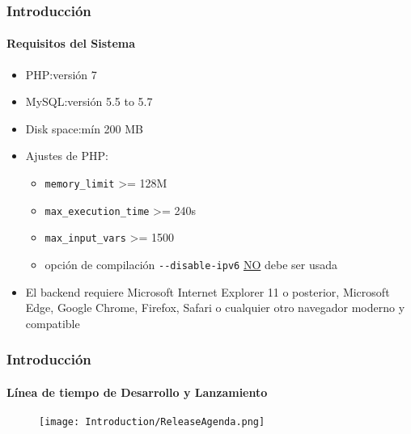 \begin{frame}[fragile]
	\frametitle{Introducción}
	\framesubtitle{Requisitos del Sistema}

	\begin{itemize}
		\item PHP:\tabto{2.2cm}versión 7
		\item MySQL:\tabto{2.2cm}versión 5.5 to 5.7
		\item Disk space:\tabto{2.2cm}mín 200 MB
		\item Ajustes de PHP:

			\begin{itemize}
				\item \texttt{memory\_limit} >= 128M
				\item \texttt{max\_execution\_time} >= 240s
				\item \texttt{max\_input\_vars} >= 1500
				\item opción de compilación \texttt{-}\texttt{-disable-ipv6} \underline{NO} debe ser usada
			\end{itemize}

		\item El backend requiere Microsoft Internet Explorer 11 o posterior,
			Microsoft Edge, Google Chrome, Firefox, Safari o cualquier otro navegador
			moderno y compatible

	\end{itemize}

\end{frame}

\begin{frame}[fragile]
	\frametitle{Introducción}
	\framesubtitle{Línea de tiempo de Desarrollo y Lanzamiento}

	\begin{figure}
		\texttt{[image: Introduction/ReleaseAgenda.png]}
	\end{figure}

\end{frame}

